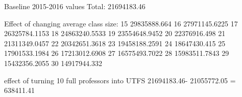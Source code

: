 Baseline 2015-2016 values
Total: 21694183.46

Effect of changing average class size:
15 29835888.664
16 27971145.6225
17 26325784.1153
18 24863240.5533
19 23554648.9452
20 22376916.498
21 21311349.0457
22 20342651.3618
23 19458188.2591
24 18647430.415
25 17901533.1984
26 17213012.6908
27 16575493.7022
28 15983511.7843
29 15432356.2055
30 14917944.332

effect of turning 10 full professors into UTFS
21694183.46- 21055772.05 = 638411.41